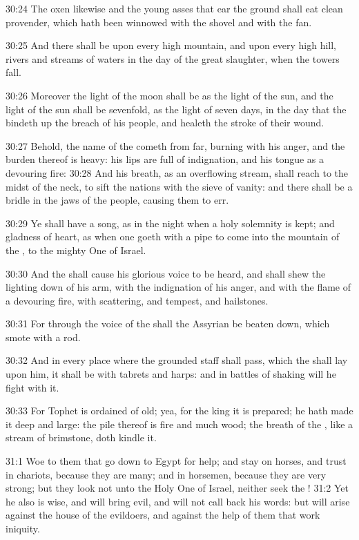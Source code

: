 30:24 The oxen likewise and the young asses that ear the ground shall eat clean provender, which hath been winnowed with the shovel and with the fan.

30:25 And there shall be upon every high mountain, and upon every high hill, rivers and streams of waters in the day of the great slaughter, when the towers fall.

30:26 Moreover the light of the moon shall be as the light of the sun, and the light of the sun shall be sevenfold, as the light of seven days, in the day that the \LORD bindeth up the breach of his people, and healeth the stroke of their wound.

30:27 Behold, the name of the \LORD cometh from far, burning with his anger, and the burden thereof is heavy: his lips are full of indignation, and his tongue as a devouring fire: 30:28 And his breath, as an overflowing stream, shall reach to the midst of the neck, to sift the nations with the sieve of vanity: and there shall be a bridle in the jaws of the people, causing them to err.

30:29 Ye shall have a song, as in the night when a holy solemnity is kept; and gladness of heart, as when one goeth with a pipe to come into the mountain of the \LORD, to the mighty One of Israel.

30:30 And the \LORD shall cause his glorious voice to be heard, and shall shew the lighting down of his arm, with the indignation of his anger, and with the flame of a devouring fire, with scattering, and tempest, and hailstones.

30:31 For through the voice of the \LORD shall the Assyrian be beaten down, which smote with a rod.

30:32 And in every place where the grounded staff shall pass, which the \LORD shall lay upon him, it shall be with tabrets and harps: and in battles of shaking will he fight with it.

30:33 For Tophet is ordained of old; yea, for the king it is prepared; he hath made it deep and large: the pile thereof is fire and much wood; the breath of the \LORD, like a stream of brimstone, doth kindle it.

31:1 Woe to them that go down to Egypt for help; and stay on horses, and trust in chariots, because they are many; and in horsemen, because they are very strong; but they look not unto the Holy One of Israel, neither seek the \LORD!  31:2 Yet he also is wise, and will bring evil, and will not call back his words: but will arise against the house of the evildoers, and against the help of them that work iniquity.

